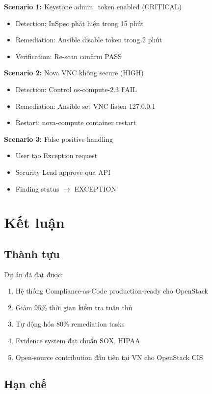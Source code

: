 \documentclass[12pt,a4paper]{report}
\begin{document}
\textbf{Scenario 1:} Keystone admin\_token enabled (CRITICAL)
\begin{itemize}
    \item Detection: InSpec phát hiện trong 15 phút
    \item Remediation: Ansible disable token trong 2 phút
    \item Verification: Re-scan confirm PASS
\end{itemize}

\textbf{Scenario 2:} Nova VNC không secure (HIGH)
\begin{itemize}
    \item Detection: Control os-compute-2.3 FAIL
    \item Remediation: Ansible set VNC listen 127.0.0.1
    \item Restart: nova-compute container restart
\end{itemize}

\textbf{Scenario 3:} False positive handling
\begin{itemize}
    \item User tạo Exception request
    \item Security Lead approve qua API
    \item Finding status $\rightarrow$ EXCEPTION
\end{itemize}

\chapter{Kết luận}

\section{Thành tựu}

Dự án đã đạt được:
\begin{enumerate}
    \item Hệ thống Compliance-as-Code production-ready cho OpenStack
    \item Giảm 95\% thời gian kiểm tra tuân thủ
    \item Tự động hóa 80\% remediation tasks
    \item Evidence system đạt chuẩn SOX, HIPAA
    \item Open-source contribution đầu tiên tại VN cho OpenStack CIS
\end{enumerate}

\section{Hạn chế}
\end{document}
